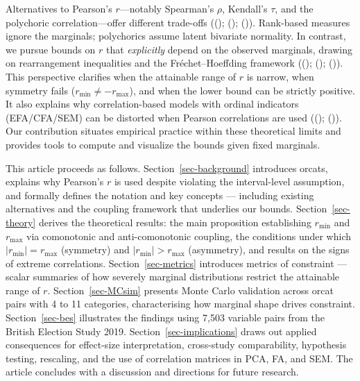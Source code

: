 \documentclass[
  12pt,
]{article}
\theoremstyle{plain}
\theoremstyle{definition}
\theoremstyle{remark}
\begin{document}
Alternatives to Pearson's \(r\)---notably Spearman's \(\rho\), Kendall's
\(\tau\), and the polychoric correlation---offer different trade-offs
(();
();
()). Rank-based measures
ignore the marginals; polychorics assume latent bivariate normality. In
contrast, we pursue bounds on \(r\) that \emph{explicitly} depend on the
observed marginals, drawing on rearrangement inequalities and the
Fréchet--Hoeffding framework ((); ();
()). This perspective
clarifies when the attainable range of \(r\) is narrow, when symmetry
fails (\(r_{\min}\neq -r_{\max}\)), and when the lower bound can be
strictly positive. It also explains why correlation-based models with
ordinal indicators (EFA/CFA/SEM) can be distorted when Pearson
correlations are used ((); ()). Our
contribution situates empirical practice within these theoretical limits
and provides tools to compute and visualize the bounds given fixed
marginals.

This article proceeds as follows. Section~\ref{sec-background}
introduces orcats, explains why Pearson's \(r\) is used despite
violating the interval-level assumption, and formally defines the
notation and key concepts --- including existing alternatives and the
coupling framework that underlies our bounds. Section~\ref{sec-theory}
derives the theoretical results: the main proposition establishing
\(r_{\min}\) and \(r_{\max}\) via comonotonic and anti-comonotonic
coupling, the conditions under which \(|r_{\min}| = r_{\max}\)
(symmetry) and \(|r_{\min}| > r_{\max}\) (asymmetry), and results on the
signs of extreme correlations. Section~\ref{sec-metrics} introduces
metrics of constraint --- scalar summaries of how severely marginal
distributions restrict the attainable range of \(r\).
Section~\ref{sec-MCsim} presents Monte Carlo validation across orcat
pairs with 4 to 11 categories, characterising how marginal shape drives
constraint. Section~\ref{sec-bes} illustrates the findings using 7,503
variable pairs from the British Election Study 2019.
Section~\ref{sec-implications} draws out applied consequences for
effect-size interpretation, cross-study comparability, hypothesis
testing, rescaling, and the use of correlation matrices in PCA, FA, and
SEM. The article concludes with a discussion and directions for future
research.
\end{document}
